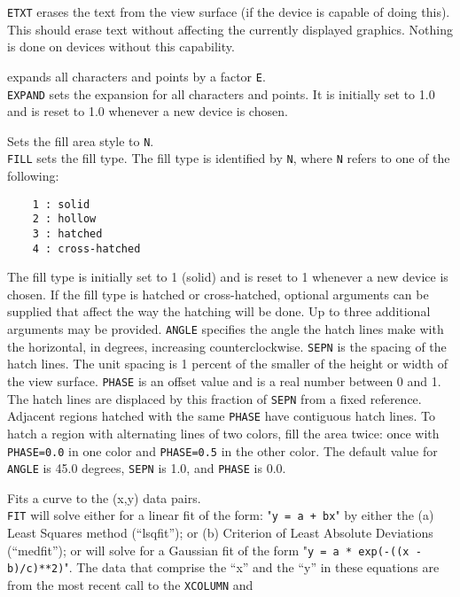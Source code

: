	{\tt ETXT} erases the text from the view surface (if the
	device is capable of doing this).  This should erase text without
	affecting the currently displayed graphics.  Nothing is done on
	devices without this capability.
\item [{\tt EXPAND E } --] expands all characters and points by a factor {\tt E}.\\
	{\tt EXPAND} sets the expansion for all characters and points.
	It is initially set to 1.0 and is reset to 1.0 whenever
	a new device is chosen. 
\item [{\tt FILL N [ANGLE [SEPN [PHASE]]] } --] Sets the fill area style to {\tt N}.\\
	{\tt FILL} sets the fill type.  The fill type is
	identified by {\tt N}, where {\tt N} refers to
	one of the following:
	\begin{verbatim}
    1 : solid
    2 : hollow
    3 : hatched
    4 : cross-hatched
	\end{verbatim}
	The fill type is initially set to 1 (solid) and is reset to 1
	whenever a new device is chosen.  If the fill type is hatched or
	cross-hatched, optional arguments can be supplied that affect
	the way the hatching will be done.  Up to three additional
	arguments may be provided.  {\tt ANGLE} specifies the
	angle the hatch lines make with the horizontal, in degrees,
	increasing counterclockwise.  {\tt SEPN} is the spacing
	of the hatch lines.  The unit spacing is 1 percent of the smaller
	of the height or width of the view surface.  {\tt PHASE}
	is an offset value and is a real number between 0 and 1.  The
	hatch lines are displaced by this fraction of {\tt SEPN}
	from a fixed reference.  Adjacent regions hatched with the
	same {\tt PHASE} have contiguous hatch lines.  To hatch
	a region with alternating lines of two colors, fill the area
	twice: once with {\tt PHASE=0.0} in one color and
	{\tt PHASE=0.5} in the other color.  The default value
	for {\tt ANGLE} is 45.0 degrees, {\tt SEPN} is 1.0,
	and {\tt PHASE} is 0.0.
\item [{\tt FIT style [N] [P1 P2 P3 \dots] } --] Fits a curve to the (x,y) data pairs.\\
	{\tt FIT} will solve either for a linear fit of the form:
	"{\tt y = a + bx}" by either the
	(a) Least Squares method (``lsqfit''); or
	(b) Criterion of Least Absolute Deviations (``medfit'');
	or will solve for a Gaussian fit of the form
	"{\tt y = a * exp(-((x - b)/c)**2)}".
	The data that comprise the ``x'' and the ``y'' in these equations are
	from the most recent call to the
	{\tt XCOLUMN} and
